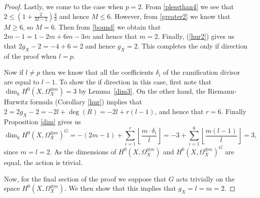 \begin{proof}
    Lastly, we come to the case when $p=2$. From \eqref{plessthan4} we see that $2\leq \left(1+\frac{2}{M-2}\right)\frac{4}{3}$ 
    and hence $M\leq 6$. However, from \eqref{greater2} we know that $M\geq 6$, so $M=6$. Then from \eqref{bound}  we obtain that $2m-1=1-2m+6m-3m$
    and hence that $m=2$. Finally, (\ref{hur2}) gives us that $2g_X-2=-4+6=2$ and hence $g_X=2$. 
    This completes the only if direction of the proof when $l=p$.
    
    Now if $l\neq p$ then we know that all the coefficients $\delta_i$ of the ramification divisor are equal to $l-1$. 
    To show the if direction in this case, first note that $\dim_kH^0(X,\Omega_X^{\otimes m})=3$ by Lemma~\ref{dim3}. 
    On the other hand, the Riemann-Hurwitz formula (Corollary \ref{hur}) implies that $2 = 2g_X-2=-2l+\deg(R)=-2l+r(l-1)$, and hence that $r=6$. 
    Finally Proposition \ref{dim} gives us
        \begin{equation*}
        \dim_kH^0(X,\Omega_X^{\otimes m})^G = -(2m-1) + \sum_{i=1}^r \left\lfloor \frac{m\cdot \delta_i}{l} \right\rfloor
        = -3 +\sum_{i=1}^6 \left\lfloor \frac{m(l-1)}{l} \right\rfloor
        = 3,
        \end{equation*}
    since $m=l=2$.
    As the dimensions of $H^0(X,\Omega_X^{\otimes m})$ and $H^0(X,\Omega_X^{\otimes m})^G$ are equal, the action is trivial.
    
    
    Now, for the final section of the proof we suppose that $G$ acts trivially on the space $H^0(X,\Omega_X^{\otimes m})$.
    We then show that this implies that $g_X=l=m=2$.
    

\end{proof}
